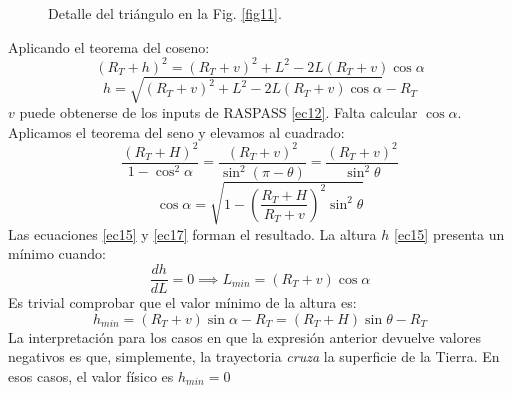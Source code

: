 \documentclass[a4paper,12pt]{article}
\numberwithin{equation}{section}
\numberwithin{figure}{section}
\begin{document}
\begin{figure}[H]

\caption{Detalle del triángulo en la Fig. \ref{fig11}.}
\label{fig12}
\end{figure}
Aplicando el teorema del coseno:
\begin{equation}
	(R_T+h)^2=(R_T+v)^2+L^2-2L(R_T+v)\cos{\alpha}
	\label{ec14}
\end{equation}
\begin{equation}
	h=\sqrt{(R_T+v)^2+L^2-2L(R_T+v)\cos{\alpha}}-R_T\label{ec15}
\end{equation}
$v$ puede obtenerse de los inputs de RASPASS \eqref{ec12}. Falta calcular $\cos\alpha$. Aplicamos el teorema del seno y elevamos al cuadrado:
\begin{equation}
	\frac{(R_T+H)^2}{1-\cos^2{\alpha}}=\frac{(R_T+v)^2}{\sin^2(\pi-\theta)}=\frac{(R_T+v)^2}{\sin^2\theta}\label{ec16}
\end{equation}
\begin{equation}
	\cos{\alpha}=\sqrt{1-\left(\frac{R_T+H}{R_T+v}\right)^2\sin^2\theta}\label{ec17}
\end{equation}
Las ecuaciones \eqref{ec15} y \eqref{ec17} forman el resultado. La altura $h$ \eqref{ec15} presenta un mínimo cuando:
\begin{equation}
	\frac{dh}{dL}=0\implies L_{min}=(R_T+v)\cos\alpha\label{ec18}
\end{equation}
Es trivial comprobar que el valor mínimo de la altura es:
\begin{equation}
	h_{min}=(R_T+v)\sin\alpha-R_T=(R_T+H)\sin\theta-R_T\label{ec19}
\end{equation}
La interpretación para los casos en que la expresión anterior devuelve valores negativos es que, simplemente, la trayectoria \textit{cruza} la superficie de la Tierra. En esos casos, el valor físico es $h_{min}=0$  
\end{document}
